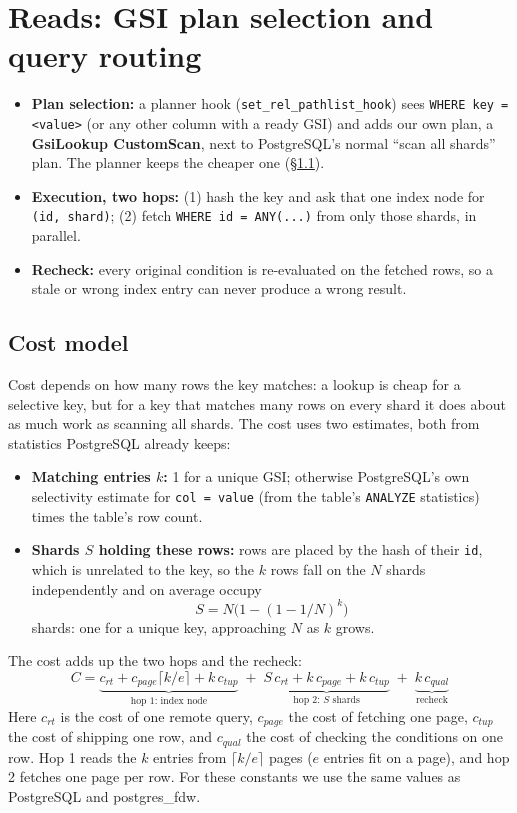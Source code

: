\documentclass[11pt,a4paper]{article}
\begin{document}
\section{Reads: GSI plan selection and query routing}
\begin{itemize}
  \item \textbf{Plan selection:} a planner hook (\texttt{set\_rel\_pathlist\_hook}) sees
        \texttt{WHERE key = <value>} (or any other column with a ready GSI) and adds our own plan, a
        \textbf{GsiLookup CustomScan}, next to PostgreSQL's normal ``scan all shards'' plan. The planner
        keeps the cheaper one (\S\ref{sec:cost}).
  \item \textbf{Execution, two hops:} (1) hash the key and ask that one index node for
        \texttt{(id, shard)}; (2) fetch \texttt{WHERE id = ANY(...)} from only those shards, in parallel.
  \item \textbf{Recheck:} every original condition is re-evaluated on the fetched rows, so a stale or
        wrong index entry can never produce a wrong result.
\end{itemize}

\subsection{Cost model}\label{sec:cost}
 Cost depends on how many rows the key matches:
a lookup is cheap for a selective key, but for a key that matches many rows on every shard it does about
as much work as scanning all shards. The cost uses two estimates, both from statistics PostgreSQL already
keeps:
\begin{itemize}
  \item \textbf{Matching entries $k$:} 1 for a unique GSI; otherwise PostgreSQL's own selectivity
        estimate for \texttt{col = value} (from the table's \texttt{ANALYZE} statistics) times the
        table's row count.
  \item \textbf{Shards $S$ holding these rows:} rows are placed by the hash of their \texttt{id}, which is
        unrelated to the key, so the $k$ rows fall on the $N$ shards independently and on average occupy
        \[ S = N\bigl(1 - (1 - 1/N)^{k}\bigr) \]
        shards: one for a unique key, approaching $N$ as $k$ grows.
\end{itemize}
The cost adds up the two hops and the recheck:
\[
  C = \underbrace{c_{rt} + c_{page}\lceil k/e\rceil + k\,c_{tup}}_{\text{hop 1: index node}}
    \;+\; \underbrace{S\,c_{rt} + k\,c_{page} + k\,c_{tup}}_{\text{hop 2: } S \text{ shards}}
    \;+\; \underbrace{k\,c_{qual}}_{\text{recheck}}
\]
Here $c_{rt}$ is the cost of one remote query, $c_{page}$ the cost of fetching one page, $c_{tup}$ the
cost of shipping one row, and $c_{qual}$ the cost of checking the conditions on one row. Hop 1 reads the
$k$ entries from $\lceil k/e\rceil$ pages ($e$ entries fit on a page), and hop 2 fetches one page per row.
For these constants we use the same values as PostgreSQL and postgres\_fdw.
\end{document}
